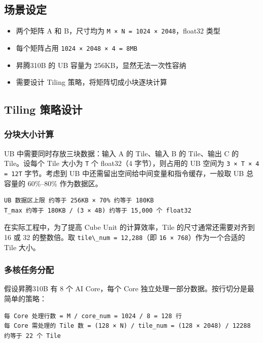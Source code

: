 \subsection{场景设定}\label{src-book-chapter7-h53}

\begin{itemize}
\tightlist
\item
  两个矩阵 A 和 B，尺寸均为
  \passthrough{\lstinline!M × N = 1024 × 2048!}，float32 类型
\item
  每个矩阵占用 \passthrough{\lstinline!1024 × 2048 × 4 = 8MB!}
\item
  昇腾310B 的 UB 容量为 256KB，显然无法一次性容纳
\item
  需要设计 Tiling 策略，将矩阵切成小块逐块计算
\end{itemize}

\subsection{Tiling 策略设计}\label{src-book-chapter7-h54}

\subsubsection{分块大小计算}\label{src-book-chapter7-h55}

UB 中需要同时存放三块数据：输入 A 的 Tile、输入 B 的 Tile、输出 C 的
Tile。设每个 Tile 大小为 \passthrough{\lstinline!T!} 个 float32（4
字节），则占用的 UB 空间为 \passthrough{\lstinline!3 × T × 4 = 12T!}
字节。考虑到 UB 中还需留出空间给中间变量和指令缓存，一般取 UB 总容量的
60\%--80\% 作为数据区。

\begin{lstlisting}
UB 数据区上限 约等于 256KB × 70% 约等于 180KB
T_max 约等于 180KB / (3 × 4B) 约等于 15,000 个 float32
\end{lstlisting}

在实际工程中，为了提高 Cube Unit 的计算效率，Tile 的尺寸通常还需要对齐到
16 或 32 的整数倍。取 \passthrough{\lstinline!tile\_num = 12,288!}（即
\passthrough{\lstinline!16 × 768!}）作为一个合适的 Tile 大小。

\subsubsection{多核任务分配}\label{src-book-chapter7-h56}

假设昇腾310B 有 8 个 AI Core，每个 Core
独立处理一部分数据。按行切分是最简单的策略：

\begin{lstlisting}
每 Core 处理行数 = M / core_num = 1024 / 8 = 128 行
每 Core 需处理的 Tile 数 = (128 × N) / tile_num = (128 × 2048) / 12288 约等于 22 个 Tile
\end{lstlisting}

